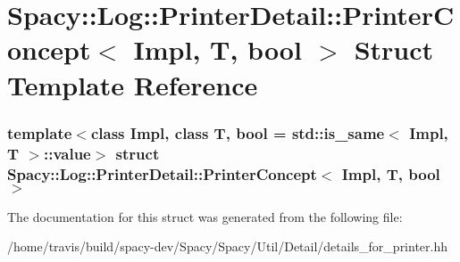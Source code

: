 \hypertarget{structSpacy_1_1Log_1_1PrinterDetail_1_1PrinterConcept}{\section{\-Spacy\-:\-:\-Log\-:\-:\-Printer\-Detail\-:\-:\-Printer\-Concept$<$ \-Impl, \-T, bool $>$ \-Struct \-Template \-Reference}
\label{structSpacy_1_1Log_1_1PrinterDetail_1_1PrinterConcept}
}
\subsubsection*{template$<$class Impl, class T, bool = std\-::is\-\_\-same$<$ Impl, T $>$\-::value$>$ struct Spacy\-::\-Log\-::\-Printer\-Detail\-::\-Printer\-Concept$<$ Impl, T, bool $>$}



\-The documentation for this struct was generated from the following file\-:\begin{DoxyCompactItemize}
\item 
/home/travis/build/spacy-\/dev/\-Spacy/\-Spacy/\-Util/\-Detail/details\-\_\-for\-\_\-printer.\-hh\end{DoxyCompactItemize}
